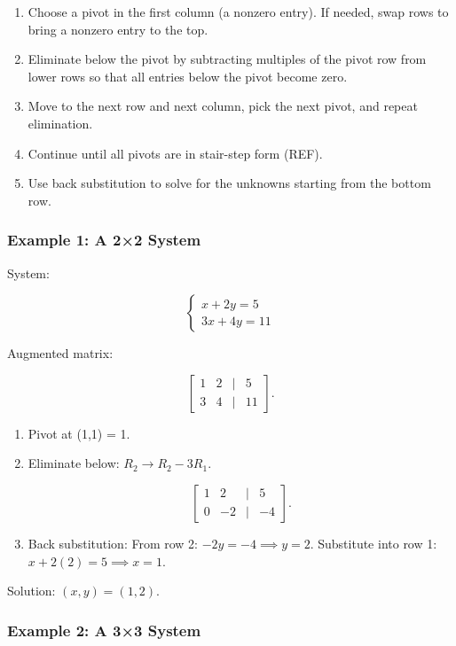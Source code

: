 \documentclass[
  letterpaper,
  DIV=11,
  numbers=noendperiod]{scrreprt}
\providecommand{\tightlist}{%
  \setlength{\itemsep}{0pt}\setlength{\parskip}{0pt}}
\begin{document}
\begin{enumerate}
\def\labelenumi{\arabic{enumi}.}
\tightlist
\item
  Choose a pivot in the first column (a nonzero entry). If needed, swap
  rows to bring a nonzero entry to the top.
\item
  Eliminate below the pivot by subtracting multiples of the pivot row
  from lower rows so that all entries below the pivot become zero.
\item
  Move to the next row and next column, pick the next pivot, and repeat
  elimination.
\item
  Continue until all pivots are in stair-step form (REF).
\item
  Use back substitution to solve for the unknowns starting from the
  bottom row.
\end{enumerate}

\subsubsection{Example 1: A 2×2 System}\label{example-1-a-22-system}

System:

\[
\begin{cases}  
x + 2y = 5 \\  
3x + 4y = 11  
\end{cases}
\]

Augmented matrix:

\[
\begin{bmatrix}  
1 & 2 & | & 5 \\  
3 & 4 & | & 11  
\end{bmatrix}.
\]

\begin{enumerate}
\def\labelenumi{\arabic{enumi}.}
\item
  Pivot at (1,1) = 1.
\item
  Eliminate below: \(R_2 \to R_2 - 3R_1\).

  \[
  \begin{bmatrix}  
  1 & 2 & | & 5 \\  
  0 & -2 & | & -4  
  \end{bmatrix}.
  \]
\item
  Back substitution: From row 2: \(-2y = -4 \implies y = 2\). Substitute
  into row 1: \(x + 2(2) = 5 \implies x = 1\).
\end{enumerate}

Solution: \((x, y) = (1, 2)\).

\subsubsection{Example 2: A 3×3 System}\label{example-2-a-33-system}
\end{document}
